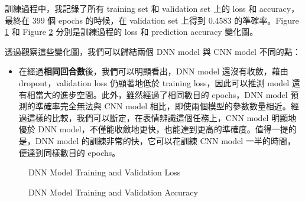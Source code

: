 \documentclass[12pt,a4paper]{extarticle}
\begin{document}
\begin{enumerate}
  \par 訓練過程中，我記錄了所有 training set 和 validation set 上的 loss 和 accuracy，最終在 399 個 epochs 的時候，在 validation set 上得到 0.4583 的準確率。Figure \ref{fig:dnn-epoch-loss} 和 Figure \ref{fig:dnn-epoch-acc} 分別是訓練過程的 loss 和 prediction accuracy 變化圖。

  \par 透過觀察這些變化圖，我們可以歸結兩個 DNN model 與 CNN model 不同的點：
  \begin{itemize}
    \item 在經過\textbf{相同回合數}後，我們可以明顯看出，DNN model 還沒有收斂，藉由 dropout，validation loss 仍顯著地低於 training loss，因此可以推測 model 還有相當大的進步空間。此外，雖然經過了相同數目的 epochs，DNN model 預測的準確率完全無法與 CNN model 相比，即使兩個模型的參數數量相近。經過這樣的比較，我們可以斷定，在表情辨識這個任務上，CNN model 明顯地優於 DNN model，不僅能收斂地更快，也能達到更高的準確度。值得一提的是，DNN model 的訓練非常的快，它可以花訓練 CNN model 一半的時間，便達到同樣數目的 epochs。
  \end{itemize}

  \begin{figure}
    \centering
    \caption{DNN Model Training and Validation Loss}
    \label{fig:dnn-epoch-loss}
  \end{figure}

  \begin{figure}
    \centering
    \caption{DNN Model Training and Validation Accuracy}
    \label{fig:dnn-epoch-acc}
  \end{figure}


\end{enumerate}
\end{document}
